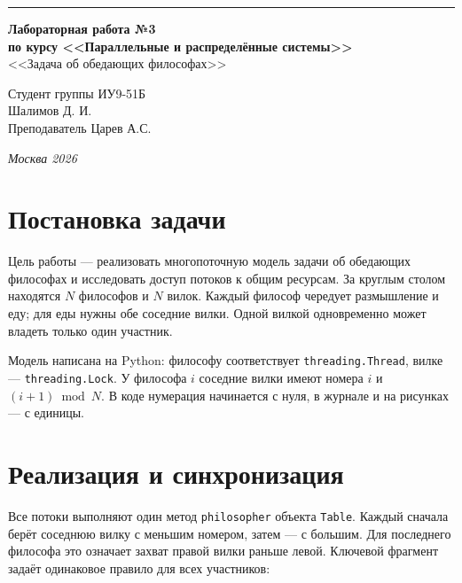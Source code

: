 \documentclass[a4paper,14pt]{extarticle}
\begin{document}
\begin{titlepage}
\vspace*{-16pt}
\hspace{30pt}\rule{0.866\textwidth}{0.4pt}

\vspace{11em}

\begin{center}
\Large \textbf{Лабораторная работа №3} \\
\large \textbf{по курсу <<Параллельные и распределённые системы>>} \\
\large <<Задача об обедающих философах>>
\end{center}

\normalsize

\vspace{8em}

\begin{flushright}
Студент группы ИУ9-51Б \\
Шалимов Д. И. \\
\vspace{2ex}
Преподаватель Царев А.С.
\end{flushright}

\bigskip
\vfill

\begin{center}
\textsl{Москва 2026}
\end{center}
\end{titlepage}

\setcounter{page}{2}
\tableofcontents
\newpage



\section{Постановка задачи}
Цель работы --- реализовать многопоточную модель задачи об обедающих
философах и исследовать доступ потоков к общим ресурсам.
За круглым столом находятся $N$ философов и $N$ вилок. Каждый философ
чередует размышление и еду; для еды нужны обе соседние вилки.
Одной вилкой одновременно может владеть только один участник.

Модель написана на Python: философу соответствует
\texttt{threading.Thread}, вилке --- \texttt{threading.Lock}.
У философа $i$ соседние вилки имеют номера $i$ и $(i+1)\bmod N$.
В коде нумерация начинается с нуля, в журнале и на рисунках --- с единицы.

\section{Реализация и синхронизация}
Все потоки выполняют один метод \texttt{philosopher} объекта \texttt{Table}.
Каждый сначала берёт соседнюю вилку с меньшим номером, затем --- с большим.
Для последнего философа это означает захват правой вилки раньше левой.
Ключевой фрагмент задаёт одинаковое правило для всех участников:
\end{document}
